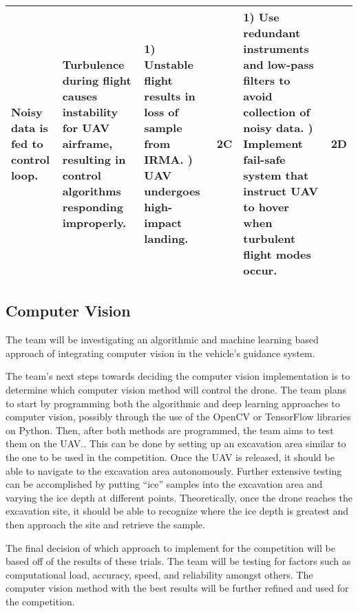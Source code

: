 \begin{table}[H]
{\begin{tabularx}{\linewidth}{XXXlXl}
            Noisy data is fed to control loop.              & Turbulence during flight causes instability for UAV airframe, resulting in control algorithms responding improperly. & 1) Unstable flight results in loss of sample from IRMA. \newline 2) UAV undergoes high-impact landing.                                & \cellcolor{orange!25} 2C  & 1) Use redundant instruments and low-pass filters to avoid collection of noisy data. \newline 2) Implement fail-safe system that instruct UAV to hover when turbulent flight modes occur.              & \cellcolor{orange!25} 2D \\
            \bottomrule
            \end{tabularx}
            }
        \end{table}
		\subsection{Computer Vision}
		The team will be investigating an algorithmic and machine learning based approach of integrating computer vision in the vehicle’s guidance system. 

The team’s next steps towards deciding the computer vision implementation is to determine which computer vision method will control the drone. The team plans to start by programming both the algorithmic and deep learning approaches to computer vision, possibly through the use of the OpenCV or TensorFlow libraries on Python. Then, after both methods are programmed, the team aims to test them on the UAV.. This can be done by setting up an excavation area similar to the one to be used in the competition. Once the UAV is released, it should be able to navigate to the excavation area autonomously. Further extensive testing can be accomplished by putting “ice” samples into the excavation area and varying the ice depth at different points. Theoretically, once the drone reaches the excavation site, it should be able to recognize where the ice depth is greatest and then approach the site and retrieve the sample.

The final decision of which approach to implement for the competition will be based off of the results of these trials. The team will be testing for factors such as computational load, accuracy, speed, and reliability amongst others. The computer vision method with the best results will be further refined and used for the competition.

